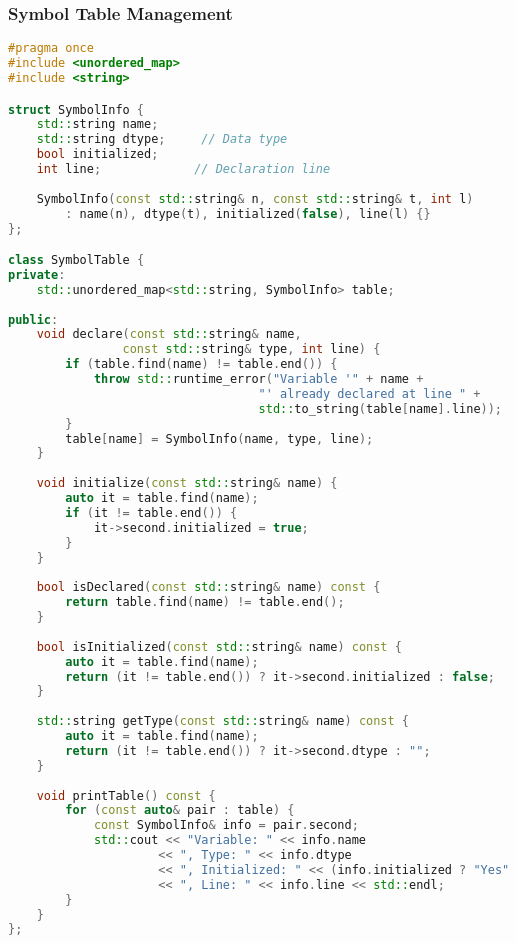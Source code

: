 \documentclass[12pt,a4paper]{article}
\begin{document}
\subsubsection{Symbol Table Management}

\begin{lstlisting}[language=C++, caption=Symbol Table Implementation]
#pragma once
#include <unordered_map>
#include <string>

struct SymbolInfo {
    std::string name;
    std::string dtype;     // Data type
    bool initialized;
    int line;             // Declaration line
    
    SymbolInfo(const std::string& n, const std::string& t, int l)
        : name(n), dtype(t), initialized(false), line(l) {}
};

class SymbolTable {
private:
    std::unordered_map<std::string, SymbolInfo> table;
    
public:
    void declare(const std::string& name, 
                const std::string& type, int line) {
        if (table.find(name) != table.end()) {
            throw std::runtime_error("Variable '" + name + 
                                   "' already declared at line " + 
                                   std::to_string(table[name].line));
        }
        table[name] = SymbolInfo(name, type, line);
    }
    
    void initialize(const std::string& name) {
        auto it = table.find(name);
        if (it != table.end()) {
            it->second.initialized = true;
        }
    }
    
    bool isDeclared(const std::string& name) const {
        return table.find(name) != table.end();
    }
    
    bool isInitialized(const std::string& name) const {
        auto it = table.find(name);
        return (it != table.end()) ? it->second.initialized : false;
    }
    
    std::string getType(const std::string& name) const {
        auto it = table.find(name);
        return (it != table.end()) ? it->second.dtype : "";
    }
    
    void printTable() const {
        for (const auto& pair : table) {
            const SymbolInfo& info = pair.second;
            std::cout << "Variable: " << info.name 
                     << ", Type: " << info.dtype
                     << ", Initialized: " << (info.initialized ? "Yes" : "No")
                     << ", Line: " << info.line << std::endl;
        }
    }
};
\end{lstlisting}
\end{document}
